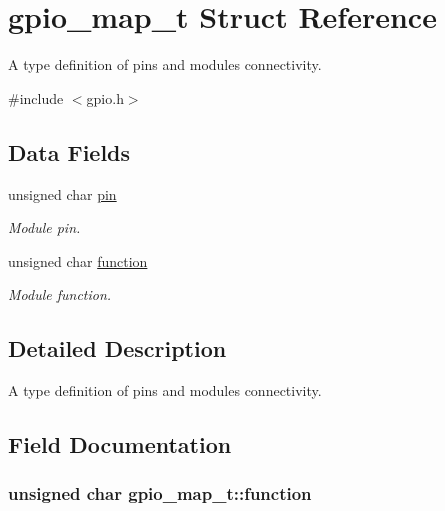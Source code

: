 \hypertarget{structgpio__map__t}{
\section{gpio\-\_\-map\-\_\-t \-Struct \-Reference}
\label{structgpio__map__t}
}


\-A type definition of pins and modules connectivity.  




{\ttfamily \#include $<$gpio.\-h$>$}

\subsection*{\-Data \-Fields}
\begin{DoxyCompactItemize}
\item 
unsigned char \hyperlink{structgpio__map__t_adcde0453f1866fc60d49fae253c1f61d}{pin}
\begin{DoxyCompactList}\small\item\em \-Module pin. \end{DoxyCompactList}\item 
unsigned char \hyperlink{structgpio__map__t_a8c496ffd37b778b552b3e7e66a6af367}{function}
\begin{DoxyCompactList}\small\item\em \-Module function. \end{DoxyCompactList}\end{DoxyCompactItemize}


\subsection{\-Detailed \-Description}
\-A type definition of pins and modules connectivity. 

\subsection{\-Field \-Documentation}
\hypertarget{structgpio__map__t_a8c496ffd37b778b552b3e7e66a6af367}{
\subsubsection[{function}]{\setlength{\rightskip}{0pt plus 5cm}unsigned char {\bf gpio\-\_\-map\-\_\-t\-::function}}}
\label{structgpio__map__t_a8c496ffd37b778b552b3e7e66a6af367}


